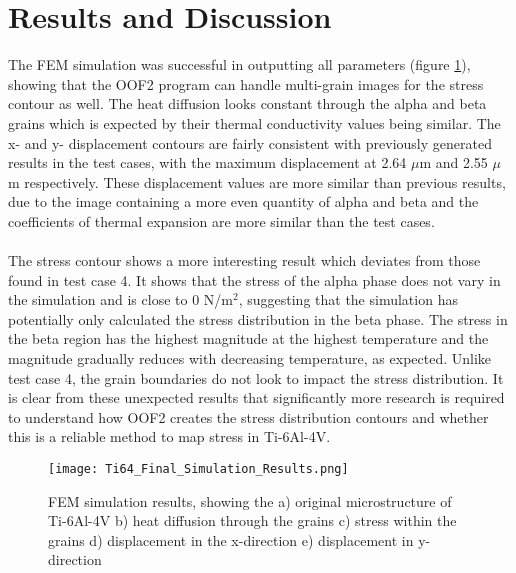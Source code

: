 \documentclass[report.tex]{subfiles}
\begin{document}
\section{Results and Discussion}

The FEM simulation was successful in outputting all parameters (figure \ref{fig:FinalSimulationResults}), showing that the OOF2 program can handle multi-grain images for the stress contour as well. The heat diffusion looks constant through the alpha and beta grains which is expected by their thermal conductivity values being similar. The x- and y- displacement contours are fairly consistent with previously generated results in the test cases, with the maximum displacement at 2.64 $\mu$m and 2.55 $\mu$m respectively. These displacement values are more similar than previous results, due to the image containing a more even quantity of alpha and beta and the coefficients of thermal expansion are more similar than the test cases.\\
\\ The stress contour shows a more interesting result which deviates from those found in test case 4. It shows that the stress of the alpha phase does not vary in the simulation and is close to 0 N/m$^2$, suggesting that the simulation has potentially only calculated the stress distribution in the beta phase. The stress in the beta region has the highest magnitude at the highest temperature and the magnitude gradually reduces with decreasing temperature, as expected. Unlike test case 4, the grain boundaries do not look to impact the stress distribution. It is clear from these unexpected results that significantly more research is required to understand how OOF2 creates the stress distribution contours and whether this is a reliable method to map stress in Ti-6Al-4V.

\begin{figure}[h!]
    \centering
    \texttt{[image: Ti64\_Final\_Simulation\_Results.png]}
    \caption{FEM simulation results, showing the a) original microstructure of Ti-6Al-4V b) heat diffusion through the grains c) stress    within the grains d) displacement in the x-direction e) displacement in y-direction}
    \label{fig:FinalSimulationResults}
\end{figure}
\end{document}
